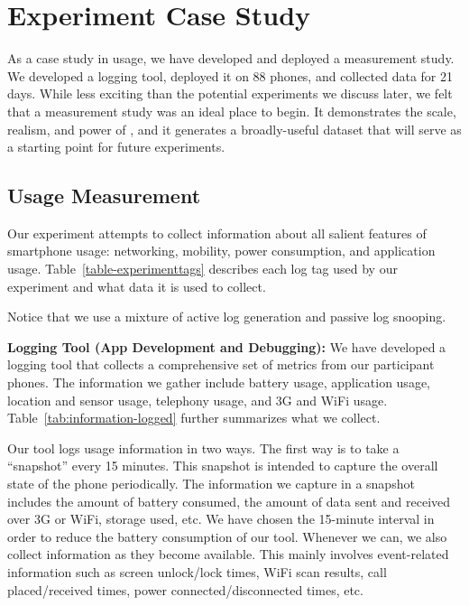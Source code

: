 \section{Experiment Case Study}
\label{sec-experiment}




As a case study in \PhoneLab{} usage, we have developed and deployed a
measurement study. We developed a logging tool, deployed it on 88 phones, and
collected data for 21 days. While less exciting than the potential
experiments we discuss later, we felt that a measurement study was an ideal
place to begin. It demonstrates the scale, realism, and power of \PhoneLab{},
and it generates a broadly-useful dataset that will serve as a starting point
for future experiments.

\subsection{Usage Measurement}

Our experiment attempts to collect information about all salient features of
smartphone usage: networking, mobility, power consumption, and application
usage. Table~\ref{table-experimenttags} describes each log tag used by our
experiment and what data it is used to collect.

Notice that we use a mixture of active log generation and passive log
snooping.

{\bf Logging Tool (App Development and Debugging):} We have developed a logging
tool that collects a comprehensive set of metrics from our participant phones.
The information we gather include battery usage, application usage, location and
sensor usage, telephony usage, and 3G and WiFi usage.
Table~\ref{tab:information-logged} further summarizes what we collect.

Our tool logs usage information in two ways. The first way is to take a
``snapshot'' every 15 minutes. This snapshot is intended to capture the overall
state of the phone periodically. The information we capture in a snapshot
includes the amount of battery consumed, the amount of data sent and received
over 3G or WiFi, storage used, etc. We have chosen the 15-minute interval in
order to reduce the battery consumption of our tool. Whenever we can, we also collect information
as they become available. This mainly involves event-related information such as
screen unlock/lock times, WiFi scan results, call placed/received times, power
connected/disconnected times, etc.

